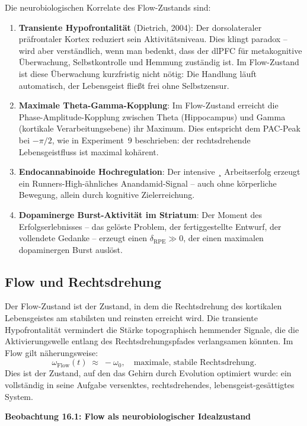 ﻿\documentclass[12pt,a4paper]{report}
\theoremstyle{plain}
\theoremstyle{definition}
\theoremstyle{remark}
\begin{document}
	Die neurobiologischen Korrelate des Flow-Zustands sind:
	\begin{enumerate}[label=\arabic*., leftmargin=1.8cm]
		\item \textbf{Transiente Hypofrontalität} (Dietrich, 2004):
		Der dorsolateraler präfrontaler Kortex reduziert sein Aktivitätsniveau.
		Dies klingt paradox -- wird aber verständlich, wenn man bedenkt,
		dass der dlPFC für metakognitive Überwachung, Selbstkontrolle
		und Hemmung zuständig ist. Im Flow-Zustand ist diese Überwachung
		kurzfristig nicht nötig: Die Handlung läuft automatisch,
		der Lebensgeist fließt frei ohne Selbstzensur.
		\item \textbf{Maximale Theta-Gamma-Kopplung}: Im Flow-Zustand
		erreicht die Phase-Amplitude-Kopplung zwischen Theta (Hippocampus)
		und Gamma (kortikale Verarbeitungsebene) ihr Maximum.
		Dies entspricht dem PAC-Peak bei $-\pi/2$, wie in Experiment~9
		beschrieben: der rechtsdrehende Lebensgeistfluss ist maximal kohärent.
		\item \textbf{Endocannabinoide Hochregulation}: Der intensive ¸ Arbeitserfolg
		erzeugt ein Run\-ners-High-ähnliches Anandamid-Signal --
		auch ohne körperliche Bewegung, allein durch kognitive Zielerreichung.
		\item \textbf{Dopaminerge Burst-Aktivität im Striatum}:
		Der Moment des Erfolgserlebnisses -- das gelöste Problem,
		der fertiggestellte Entwurf, der vollendete Gedanke --
		erzeugt einen $\delta_{\mathrm{RPE}} \gg 0$, der einen maximalen
		dopaminergen Burst auslöst.
	\end{enumerate}

	\subsection{Flow und Rechtsdrehung}

	Der Flow-Zustand ist der Zustand, in dem die Rechtsdrehung
	des kortikalen Lebensgeistes am stabilsten und reinsten erreicht wird.
	Die transiente Hypofrontalität vermindert die Stärke topographisch
	hemmender Signale, die die Aktivierungswelle entlang des
	Rechtsdrehungspfades verlangsamen könnten.
	Im Flow gilt näherungsweise:
	\[
	\omega_{\mathrm{Flow}}(t) \;\approx\; -\omega_0,
	\quad \text{maximale, stabile Rechtsdrehung}.
	\]
	Dies ist der Zustand, auf den das Gehirn durch Evolution optimiert
	wurde: ein vollständig in seine Aufgabe versenktes, rechtsdrehendes,
	lebensgeist-gesättigtes System.

	
	\noindent\textbf{Beobachtung 16.1: Flow als neurobiologischer Idealzustand}
\end{document}

